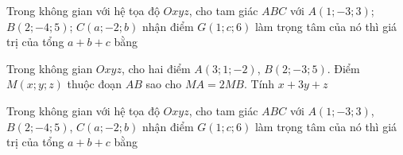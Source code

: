 \begin{bt}%
	Trong không gian với hệ tọa độ $Oxyz$, cho tam giác $ABC$ với $A(1;-3;3)$; $B(2;-4;5)$; $C(a;-2;b)$ nhận điểm $G(1;c;6)$ làm trọng  tâm của nó thì giá trị của tổng $a+b+c$ bằng
\end{bt}

\begin{bt}%
	Trong không gian  $Oxyz$, cho hai điểm $A(3;1;-2)$, $B(2;-3;5)$. Điểm $M(x;y;z)$ thuộc đoạn $AB$ sao cho $MA=2MB$. Tính $x+3y+z$
\end{bt}

\begin{bt}%
	Trong không gian với hệ tọa độ $Oxyz$, cho tam  giác $ABC$ với $A\left(1;-3;3\right)$, $B\left(2;-4;5\right)$, $C\left(a;-2;b\right)$ nhận điểm $G\left(1;c;6\right)$ làm trọng tâm của nó thì giá trị của tổng $a+b+c$ bằng
\end{bt}

